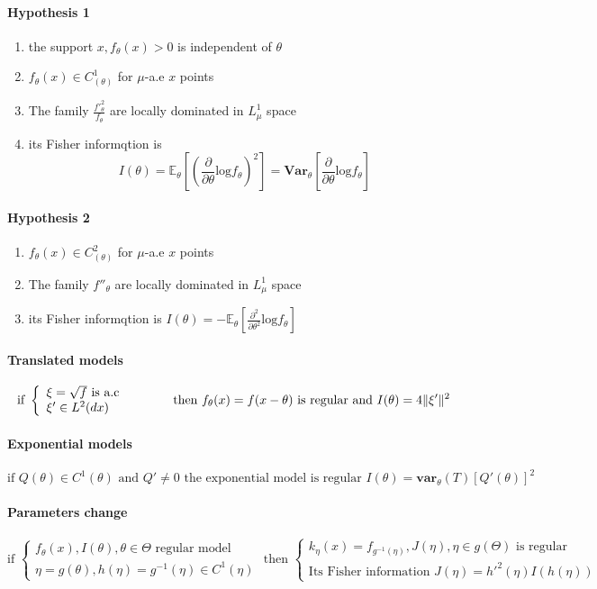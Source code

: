 \documentclass[a4paper,10pt]{article}
\begin{document}
\paragraph{Hypothesis 1}
\begin{enumerate}
 \item the support {$x, f_{\theta}(x)>0$} is independent of $\theta$
 \item $f_{\theta}(x) \in C^1_{(\theta)}$ for $\mu$-a.e $x$ points  
 \item The family {$\frac{f'^2_{\theta}}{f_{\theta}} $} are locally dominated in $L^1_{\mu}$ space
 \item its Fisher informqtion is 
\[
I(\theta) 
= \mathbb{E}_{\theta}[( \frac{\partial}{\partial \theta} \text{log}f_{\theta} )^2]
= \textbf{Var}_{\theta} [ \frac{\partial}{\partial \theta} \text{log} f_{\theta}]  
\]
\end{enumerate}

\paragraph{Hypothesis 2}
\begin{enumerate}
 \item $f_{\theta}(x) \in C^2_{(\theta)}$ for $\mu$-a.e $x$ points 
 \item The family {$f''_{\theta}$} are locally dominated in $L^1_{\mu}$ space
 \item its Fisher informqtion is $I(\theta) = -\mathbb{E}_{\theta}[ \frac{\partial^2}{\partial \theta^2} \text{log}f_{\theta} ]$
\end{enumerate}
\paragraph{Translated models}
\[
\text{if }
\left\{
\begin{array}{l}
\xi = \sqrt{f} \text{ is a.c } \\
\xi' \in L^2(dx)
\end{array}\right.
\hspace{10mm}
\text{ then }
f_{\theta}(x)=f(x-\theta) \text{ is regular and } I(\theta)=4\| \xi' \|^2 
\]
\paragraph{Exponential models}
\[
\text{if } Q(\theta) \in C^{1}(\theta) \text{ and } Q'\neq 0 \text{ the exponential model is regular } I(\theta) = \textbf{var}_{\theta}(T)[Q'(\theta)]^2
\]
\paragraph{Parameters change}
\[
\text{if }
\left\{
\begin{array}{l}
f_{\theta}(x) ,I(\theta) , \theta \in \Theta \text{ regular model} \\
\eta = g(\theta), h(\eta)=g^{-1}(\eta) \in C^1(\eta)
\end{array}\right.
\text{ then }
\left\{
\begin{array}{l}
k_{\eta}(x) = f_{g^{-1}(\eta)} ,J(\eta), \eta \in g(\Theta) \text{ is regular} \\
\text{Its Fisher information } J(\eta) =  h'^2(\eta) I(h(\eta)) 
\end{array}\right.
\]
\end{document}
